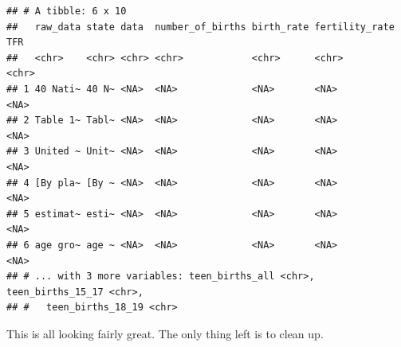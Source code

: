 \documentclass[
]{book}
\newenvironment{Shaded}{\begin{snugshade}}{\end{snugshade}}
\newcommand{\CharTok}[1]{\textcolor[rgb]{0.31,0.60,0.02}{#1}}
\newcommand{\DataTypeTok}[1]{\textcolor[rgb]{0.13,0.29,0.53}{#1}}
\newcommand{\DecValTok}[1]{\textcolor[rgb]{0.00,0.00,0.81}{#1}}
\newcommand{\KeywordTok}[1]{\textcolor[rgb]{0.13,0.29,0.53}{\textbf{#1}}}
\newcommand{\NormalTok}[1]{#1}
\newcommand{\OperatorTok}[1]{\textcolor[rgb]{0.81,0.36,0.00}{\textbf{#1}}}
\newcommand{\OtherTok}[1]{\textcolor[rgb]{0.56,0.35,0.01}{#1}}
\newcommand{\StringTok}[1]{\textcolor[rgb]{0.31,0.60,0.02}{#1}}
\begin{document}
\begin{Shaded}
\end{Shaded}

\begin{verbatim}
## # A tibble: 6 x 10
##   raw_data state data  number_of_births birth_rate fertility_rate TFR  
##   <chr>    <chr> <chr> <chr>            <chr>      <chr>          <chr>
## 1 40 Nati~ 40 N~ <NA>  <NA>             <NA>       <NA>           <NA> 
## 2 Table 1~ Tabl~ <NA>  <NA>             <NA>       <NA>           <NA> 
## 3 United ~ Unit~ <NA>  <NA>             <NA>       <NA>           <NA> 
## 4 [By pla~ [By ~ <NA>  <NA>             <NA>       <NA>           <NA> 
## 5 estimat~ esti~ <NA>  <NA>             <NA>       <NA>           <NA> 
## 6 age gro~ age ~ <NA>  <NA>             <NA>       <NA>           <NA> 
## # ... with 3 more variables: teen_births_all <chr>, teen_births_15_17 <chr>,
## #   teen_births_18_19 <chr>
\end{verbatim}

This is all looking fairly great. The only thing left is to clean up.

\begin{Shaded}
\end{Shaded}
\end{document}
